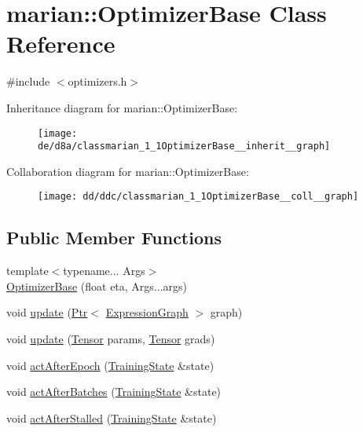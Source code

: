 \hypertarget{classmarian_1_1OptimizerBase}{}\section{marian\+:\+:Optimizer\+Base Class Reference}
\label{classmarian_1_1OptimizerBase}


{\ttfamily \#include $<$optimizers.\+h$>$}



Inheritance diagram for marian\+:\+:Optimizer\+Base\+:
\nopagebreak
\begin{figure}[H]
\begin{center}
\leavevmode
\texttt{[image: de/d8a/classmarian\_1\_1OptimizerBase\_\_inherit\_\_graph]}
\end{center}
\end{figure}


Collaboration diagram for marian\+:\+:Optimizer\+Base\+:
\nopagebreak
\begin{figure}[H]
\begin{center}
\leavevmode
\texttt{[image: dd/ddc/classmarian\_1\_1OptimizerBase\_\_coll\_\_graph]}
\end{center}
\end{figure}
\subsection*{Public Member Functions}
\begin{DoxyCompactItemize}
\item 
{\footnotesize template$<$typename... Args$>$ }\\\hyperlink{classmarian_1_1OptimizerBase_ad9dfe9f4b229d38bd9a0f6b53d9f9488}{Optimizer\+Base} (float eta, Args...\+args)
\item 
void \hyperlink{classmarian_1_1OptimizerBase_a7bfd912c8dbb63dae60cee9fe3718e0a}{update} (\hyperlink{namespacemarian_ad1a373be43a00ef9ce35666145137b08}{Ptr}$<$ \hyperlink{classmarian_1_1ExpressionGraph}{Expression\+Graph} $>$ graph)
\item 
void \hyperlink{classmarian_1_1OptimizerBase_acddf953946c7808bc45b7e84cda7299c}{update} (\hyperlink{namespacemarian_a88b71ec34bb354564cddc24eb80f7e14}{Tensor} params, \hyperlink{namespacemarian_a88b71ec34bb354564cddc24eb80f7e14}{Tensor} grads)
\item 
void \hyperlink{classmarian_1_1OptimizerBase_aab974f017773f25b979ceb42d7d98752}{act\+After\+Epoch} (\hyperlink{classmarian_1_1TrainingState}{Training\+State} \&state)
\item 
void \hyperlink{classmarian_1_1OptimizerBase_a208c189f94d7f1cee8005d4472539116}{act\+After\+Batches} (\hyperlink{classmarian_1_1TrainingState}{Training\+State} \&state)
\item 
void \hyperlink{classmarian_1_1OptimizerBase_a6e14a01324f548d37a530a6be2237ce9}{act\+After\+Stalled} (\hyperlink{classmarian_1_1TrainingState}{Training\+State} \&state)
\end{DoxyCompactItemize}
